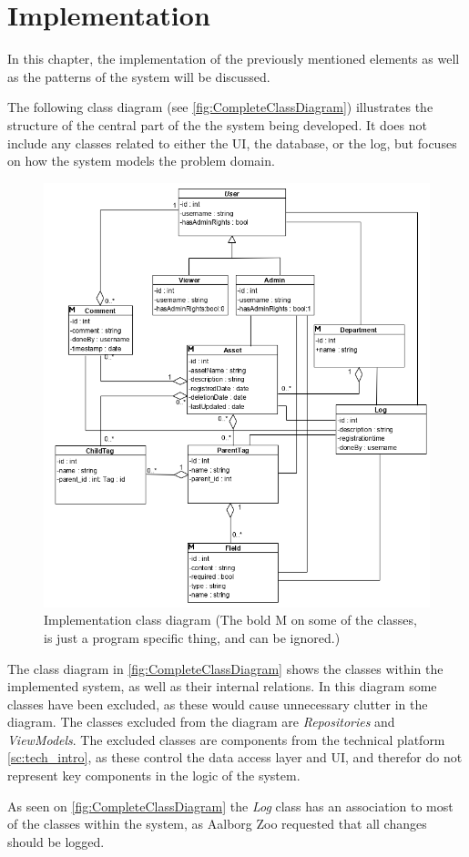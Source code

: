 \chapter{Implementation}
In this chapter, the implementation of the previously mentioned elements as well as the patterns of the system will be discussed.
\par
The following class diagram (see \autoref{fig:CompleteClassDiagram}) illustrates the structure of the central part of the the system being developed. It does not include any classes related to either the UI, the database, or the log, but focuses on how the system models the problem domain. 

\begin{figure}[H]
    \centering
    \includegraphics[width=1\textwidth]{figures/ClassDiagrams/ClassDiagramV6.PNG}
    \caption{Implementation class diagram (The bold M on some of the classes, is just a program specific thing, and can be ignored.)}
    \label{fig:CompleteClassDiagram}
\end{figure}

The class diagram in \autoref{fig:CompleteClassDiagram} shows the classes within the implemented system, as well as their internal relations. In this diagram some classes have been excluded, as these would cause unnecessary clutter in the diagram. The classes excluded from the diagram are \textit{Repositories} and \textit{ViewModels}. The excluded classes are components from the technical platform \autoref{sc:tech_intro}, as these control the data access layer and UI, and therefor do not represent key components in the logic of the system. 
\par
As seen on \autoref{fig:CompleteClassDiagram} the \textit{Log} class has an association to most of the classes within the system, as Aalborg Zoo requested that all changes should be logged. 